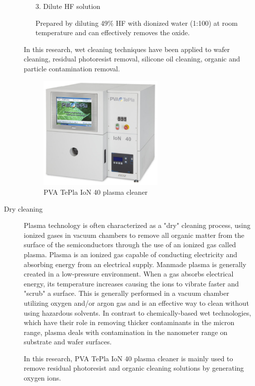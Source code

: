 \begin{description}
\begin{itemize}
\item[3.] Dilute HF solution

Prepared by diluting 49$\%$ HF  with dionized water (1:100) at room temperature and can effectively removes the oxide.

\end{itemize}

In this research, wet  cleaning techniques have been applied to wafer  cleaning, residual photoresist  removal, silicone oil cleaning, organic and particle contamination removal.


\begin{figure}[t] 
\centering    
\includegraphics[width=0.6\textwidth]{plasma}
\caption[PVA TePla IoN 40 plasma cleaner]{PVA TePla IoN 40 plasma cleaner}
\label{fig:plasma}
\end{figure}

\item [Dry cleaning] Plasma technology is often characterized as a "dry" cleaning  process, using ionized gases in vacuum chambers to remove all organic matter from the surface of the semiconductors through the use of an ionized gas called plasma. Plasma is an ionized gas capable of conducting electricity and absorbing energy from an electrical supply. Manmade plasma is generally created in a low-pressure environment. When a gas absorbs electrical energy, its temperature increases causing the ions to vibrate faster and "scrub" a  surface. This is generally performed in a vacuum chamber utilizing oxygen and/or argon gas and is an effective way to clean without using hazardous solvents. In contrast to chemically-based wet technologies, which have their role in removing thicker contaminants in the  micron range, plasma deals with contamination in the nanometer range on substrate and wafer surfaces.

In this research, PVA TePla IoN 40 plasma cleaner is mainly used to remove residual photoresist  and organic cleaning solutions by generating oxygen ions.
 
\end{description}

